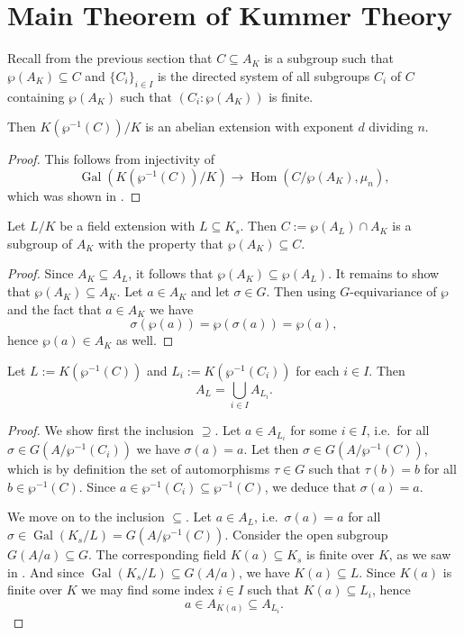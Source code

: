 \documentclass[12pt]{amsart}
\DeclareMathOperator{\Hom}{Hom}
\DeclareMathOperator{\Gal}{Gal}
\begin{document}
\section{Main Theorem of Kummer Theory}

Recall from the previous section that $C\subseteq A_{K}$ is a subgroup such that $\wp(A_{K})\subseteq C$ and $\{ C_{i} \}_{i\in I}$ is the directed system of all subgroups $C_{i}$ of $C$ containing $\wp(A_{K})$ such that $(C_{i}:\wp(A_{K}))$ is finite.

\begin{lm}\label{lm:fieldwelldefined}
    Then $K(\wp^{-1}(C))/K$ is an abelian extension with exponent $d$ dividing $n$.
    \begin{proof}
	This follows from injectivity of 
	\[ \Gal(K(\wp^{-1}(C))/K)\to \Hom(C/\wp(A_{K}),\mu_{n}), \]
	which was shown in .
    \end{proof}
\end{lm}

\begin{lm}\label{lm:groupwelldefined}
    Let $L/K$ be a field extension with $L\subseteq K_{s}$.
    Then $C:=\wp(A_{L})\cap A_{K}$ is a subgroup of $A_{K}$ with the property that $\wp(A_{K})\subseteq C$.
    \begin{proof}
	Since $A_{K}\subseteq A_{L}$, it follows that $\wp(A_{K})\subseteq \wp(A_{L})$.
	It remains to show that $\wp(A_{K})\subseteq A_{K}$.
	Let $a\in A_{K}$ and let $\sigma \in G$.
	Then using $G$-equivariance of $\wp$ and the fact that $a\in A_{K}$ we have
	\[ \sigma(\wp(a))=\wp(\sigma(a))=\wp(a), \]
	hence $\wp(a)\in A_{K}$ as well.
    \end{proof}
\end{lm}

\begin{lm}\label{lm:coefficients}
    Let $L:=K(\wp^{-1}(C))$ and $L_{i}:=K(\wp^{-1}(C_{i}))$ for each $i\in I$.
    Then
    \[ A_{L}=\bigcup_{i\in I}A_{L_{i}}. \]
    \begin{proof}
	We show first the inclusion $\supseteq $.
	Let $a\in A_{L_{i}}$ for some $i\in I$, i.e.~for all $\sigma\in G(A/\wp^{-1}(C_{i}))$ we have $\sigma(a)=a$.
	Let then $\sigma\in G(A/\wp^{-1}(C))$, which is by definition the set of automorphisms $\tau\in G$ such that $\tau(b)=b$ for all $b\in \wp^{-1}(C)$.
	Since $a\in \wp^{-1}(C_{i})\subseteq \wp^{-1}(C)$, we deduce that $\sigma(a)=a$.

	We move on to the inclusion $\subseteq $.
	Let $a\in A_{L}$, i.e.~$\sigma(a)=a$ for all $\sigma\in \Gal(K_{s}/L)=G(A/\wp^{-1}(C))$.
	Consider the open subgroup $G(A/a)\subseteq G$.
	The corresponding field $K(a)\subseteq K_{s}$ is finite over $K$, as we saw in .
	And since $\Gal(K_{s}/L)\subseteq G(A/a)$, we have $K(a)\subseteq L$.
	Since $K(a)$ is finite over $K$ we may find some index $i\in I$ such that $K(a)\subseteq L_{i}$, hence
	\[ a\in A_{K(a)}\subseteq A_{L_{i}}. \]
    \end{proof}
\end{lm}
\end{document}
